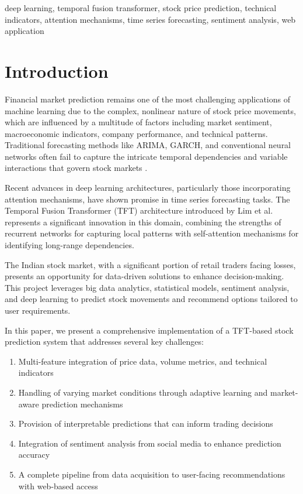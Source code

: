 \documentclass[conference]{IEEEtran}
\begin{document}
\begin{IEEEkeywords}
deep learning, temporal fusion transformer, stock price prediction, technical indicators, attention mechanisms, time series forecasting, sentiment analysis, web application
\end{IEEEkeywords}

\section{Introduction}

Financial market prediction remains one of the most challenging applications of machine learning due to the complex, nonlinear nature of stock price movements, which are influenced by a multitude of factors including market sentiment, macroeconomic indicators, company performance, and technical patterns. Traditional forecasting methods like ARIMA, GARCH, and conventional neural networks often fail to capture the intricate temporal dependencies and variable interactions that govern stock markets \cite{bao2017deep}.

Recent advances in deep learning architectures, particularly those incorporating attention mechanisms, have shown promise in time series forecasting tasks. The Temporal Fusion Transformer (TFT) architecture introduced by Lim et al. \cite{lim2021temporal} represents a significant innovation in this domain, combining the strengths of recurrent networks for capturing local patterns with self-attention mechanisms for identifying long-range dependencies.

The Indian stock market, with a significant portion of retail traders facing losses, presents an opportunity for data-driven solutions to enhance decision-making. This project leverages big data analytics, statistical models, sentiment analysis, and deep learning to predict stock movements and recommend options tailored to user requirements.

In this paper, we present a comprehensive implementation of a TFT-based stock prediction system that addresses several key challenges:

\begin{enumerate}
\item Multi-feature integration of price data, volume metrics, and technical indicators
\item Handling of varying market conditions through adaptive learning and market-aware prediction mechanisms
\item Provision of interpretable predictions that can inform trading decisions
\item Integration of sentiment analysis from social media to enhance prediction accuracy
\item A complete pipeline from data acquisition to user-facing recommendations with web-based access
\end{enumerate}
\end{document}
